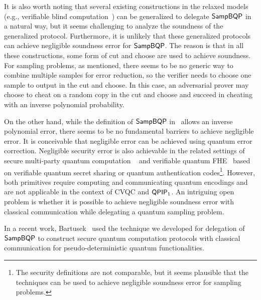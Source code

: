 

It is also worth noting that several existing constructions in the relaxed models (e.g., verifiable blind computation~\cite{FK17}) can be generalized to delegate $\operatorname{\mathsf{SampBQP}}$ in a natural way, but it seems challenging to analyze the soundness of the generalized protocol. Furthermore, it is unlikely that these generalized protocols can achieve negligible soundness error for $\operatorname{\mathsf{SampBQP}}$. The reason is that in all these constructions, some form of cut and choose are used to achieve soundness.
For sampling problems, as mentioned, there seems to be no generic way to combine multiple samples for error reduction, so the verifier needs to choose one sample to output in the cut and choose. In this case, an adversarial prover may choose to cheat on a random copy in the cut and choose and succeed in cheating with an inverse polynomial probability. 

On the other hand, while the definition of $\operatorname{\mathsf{SampBQP}}$ in~\cite{aaronson_2013, Boson} allows an inverse polynomial error, there seems to be no fundamental barriers to achieve negligible error. It is conceivable that negligible error can be achieved using quantum error correction. Negligible security error is also achievable in the related settings of secure multi-party quantum computation ~\cite{CGS02,DNS12} and verifiable quantum FHE~\cite{ADSS17} based on verifiable quantum secret sharing or quantum authentication codes\footnote{The security definitions are not comparable, but it seems plausible that the techniques can be used to achieve negligible soundness error for sampling problems.}. However, both primitives require computing and communicating quantum encodings and are not applicable in the context of CVQC and $\operatorname{\mathsf{QPIP}}_1$. An intriguing open problem is whether it is possible to achieve negligible soundness error with classical communication while delegating a quantum sampling problem.

In a recent work, Bartusek~\cite{bartuseksecure} used the technique we developed for delegation of $\operatorname{\mathsf{SampBQP}}$ to construct secure quantum computation protocols with classical communication for pseudo-deterministic quantum functionalities.


